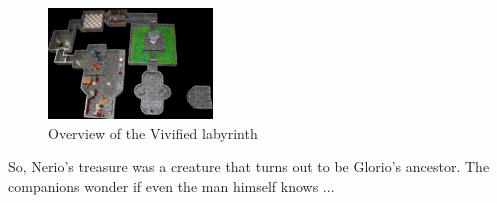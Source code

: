 \begin{figure}[h]
	\centering
	\includegraphics[width=0.39\textwidth]{images/Overview-of-the-Vivified-labyrinth-565302683.jpg}
	\caption{Overview of the Vivified labyrinth}
	\label{fig:Overview-of-the-Vivified-labyrinth-565302683}
\end{figure}

So, Nerio's treasure was a creature that turns out to be Glorio's ancestor. The companions wonder if even the man himself knows ...\\

